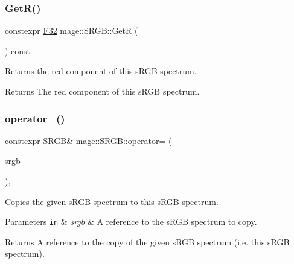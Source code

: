 \subsubsection{\texorpdfstring{Get\+R()}{GetR()}}
{\footnotesize\ttfamily constexpr \mbox{\hyperlink{namespacemage_aa97e833b45f06d60a0a9c4fc22ae02c0}{F32}} mage\+::\+S\+R\+G\+B\+::\+GetR (\begin{DoxyParamCaption}{ }\end{DoxyParamCaption}) const\hspace{0.3cm}{\ttfamily [noexcept]}}

Returns the red component of this s\+R\+GB spectrum.

\begin{DoxyReturn}{Returns}
The red component of this s\+R\+GB spectrum. 
\end{DoxyReturn}
\mbox{\label{structmage_1_1_s_r_g_b_ab4feb5cd04c21c03d2278468e3241562}} 
\subsubsection{\texorpdfstring{operator=()}{operator=()}\hspace{0.1cm}{\footnotesize\ttfamily [1/2]}}
{\footnotesize\ttfamily constexpr \mbox{\hyperlink{structmage_1_1_s_r_g_b}{S\+R\+GB}}\& mage\+::\+S\+R\+G\+B\+::operator= (\begin{DoxyParamCaption}\item[{const \mbox{\hyperlink{structmage_1_1_s_r_g_b}{S\+R\+GB}} \&}]{srgb }\end{DoxyParamCaption})\hspace{0.3cm}{\ttfamily [default]}, {\ttfamily [noexcept]}}

Copies the given s\+R\+GB spectrum to this s\+R\+GB spectrum.


\begin{DoxyParams}[1]{Parameters}
\mbox{\tt in}  & {\em srgb} & A reference to the s\+R\+GB spectrum to copy. \\
\hline
\end{DoxyParams}
\begin{DoxyReturn}{Returns}
A reference to the copy of the given s\+R\+GB spectrum (i.\+e. this s\+R\+GB spectrum). 
\end{DoxyReturn}
\mbox{\label{structmage_1_1_s_r_g_b_aef2e40794d1465801e998d64d94f782d}} 
